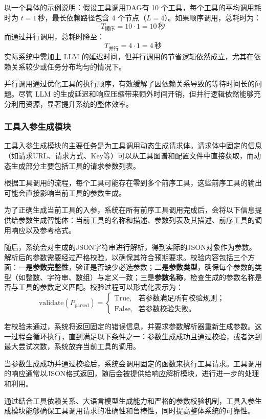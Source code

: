 以一个具体的示例说明：假设工具调用DAG有 10 个工具，每个工具的平均调用耗时为 \(t = 1 \, \text{秒}\)，最长依赖路径包含 4 个节点（\(L = 4\)）。如果顺序调用，总耗时为：
\[
T_{\text{顺序}} = 10 \cdot 1 = 10 \, \text{秒}
\]
而通过并行调用，总耗时降至：
\[
T_{\text{并行}} = 4 \cdot 1 = 4 \, \text{秒}
\]
实际系统中需加上 LLM 的延迟时间，但并行调用的节省逻辑依然成立，尤其在依赖关系较少或任务分布均匀的情况下。

并行调用通过优化工具的执行顺序，有效缓解了因依赖关系导致的等待时间长的问题。尽管 LLM 的生成延迟和响应压缩带来额外时间开销，但并行逻辑依然能够充分利用资源，显著提升系统的整体效率。

\subsubsection{工具入参生成模块}

工具入参生成模块的主要任务是为工具调用动态生成请求体。请求体中固定的信息（如请求URL、请求方式、Key等）可以从工具图谱和配置文件中直接获取，而动态生成部分主要包括工具的请求参数列表。

根据工具调用的流程，每个工具可能存在零到多个前序工具，这些前序工具的输出可能会直接影响当前工具的参数生成。

为了正确生成当前工具的入参，系统在所有前序工具调用完成后，会将以下信息提供给参数生成智能体：当前工具的名称和描述、参数列表及其描述、前序工具的调用响应以及参考格式。

随后，系统会对生成的JSON字符串进行解析，得到实际的JSON对象作为参数。解析后的参数需要经过严格校验，以确保其符合预期要求。校验内容包括三个方面：一是\textbf{参数完整性}，验证是否缺少必选参数；二是\textbf{参数类型}，确保每个参数的类型（如整数、字符串、数组）与定义一致；三是\textbf{参数名称}，检查生成的参数名称是否与工具的参数定义匹配。校验过程可以形式化表示为：
\[
\text{validate}(P_{\text{parsed}}) =
\begin{cases}
\text{True}, & \text{若参数满足所有校验规则；} \\
\text{False}, & \text{若参数校验失败。}
\end{cases}
\]

若校验未通过，系统将返回固定的错误信息，并要求参数解析器重新生成参数。这一过程会循环执行，直到满足以下条件之一：参数生成成功且通过校验，或者达到最大尝试次数，系统放弃当前工具的调用。

当参数生成成功并通过校验后，系统会调用固定的函数来执行工具请求。工具调用的响应通常以JSON格式返回，随后会被提供给响应解析模块，进行进一步的处理和利用。

通过结合工具依赖关系、大语言模型生成能力和严格的参数校验机制，工具入参生成模块能够确保工具调用请求的准确性和鲁棒性，同时提高整体系统的可靠性。

